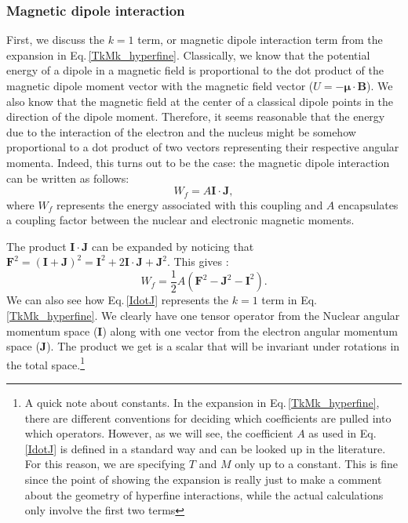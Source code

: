 \subsubsection{Magnetic dipole interaction}
First, we discuss the $k=1$ term, or magnetic dipole interaction term from the expansion in Eq.\,\eqref{TkMk_hyperfine}. Classically, we know that the potential energy of a dipole in a magnetic field is proportional to the dot product of the magnetic dipole moment vector with the magnetic field vector ($U=-\mathbf{\mu}\cdot\mathbf{B}$). We also know that the magnetic field at the center of a classical dipole points in the direction of the dipole moment. Therefore, it seems reasonable that the energy due to the interaction of the electron and the nucleus might be somehow proportional to a dot product of two vectors representing their respective angular momenta. Indeed, this turns out to be the case: the magnetic dipole interaction can be written as follows\cite{sobelman_spectra}: 
\begin{equation}\label{IdotJ}
W_f=A\mathbf{I}\cdot\mathbf{J},
\end{equation}
where $W_f$ represents the energy associated with this coupling and $A$ encapsulates a coupling factor between the nuclear and electronic magnetic moments. 

The product $\mathbf{I}\cdot\mathbf{J}$ can be expanded by noticing that $\mathbf{F}^2=(\mathbf{I}+\mathbf{J})^2=\mathbf{I}^2+2 \mathbf{I}\cdot\mathbf{J}+\mathbf{J}^2$. This gives \cite{cuaMITnotes}\cite{sobelman_spectra}: 
\begin{equation}\label{Wf_dot_product}
W_f=\frac{1}{2}A(\mathbf{F}^2-\mathbf{J}^2-\mathbf{I}^2).
\end{equation}
We can also see how Eq.\,\ref{IdotJ} represents the $k=1$ term in Eq.\,\eqref{TkMk_hyperfine}. We clearly have one tensor operator from the Nuclear angular momentum space ($\mathbf{I}$) along with one vector from the electron angular momentum space ($\mathbf{J}$). The product we get is a scalar that will be invariant under rotations in the total space.\footnote{A quick note about constants. In the expansion in Eq.\,\eqref{TkMk_hyperfine}, there are different conventions \cite{schwartz_hyperfine_expansion} for deciding which coefficients are pulled into which operators. However, as we will see, the coefficient $A$ as used in Eq.\,\ref{IdotJ} is defined in a standard way and can be looked up in the literature. For this reason, we are specifying $T$ and $M$ only up to a constant. This is fine since the point of showing the expansion is really just to make a comment about the geometry of hyperfine interactions, while the actual calculations only involve the first two terms}

